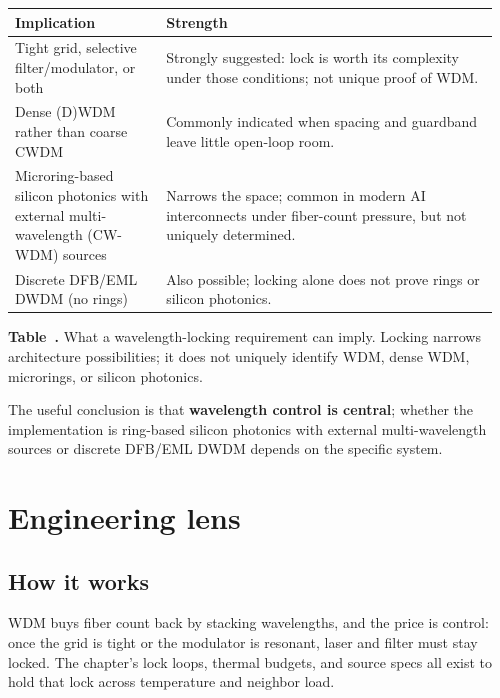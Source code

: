 \begin{table}[ht]
\label{tab:wdm-read}%
\centering
\setlength{\tabcolsep}{5pt}%
\renewcommand{\arraystretch}{1.25}%
\begin{tabular}{@{}p{0.30\linewidth}p{0.66\linewidth}@{}}
\toprule
Implication & Strength \\
\midrule
Tight grid, selective filter/modulator, or both & Strongly suggested: lock is worth its complexity under those conditions; not unique proof of WDM. \\
\addlinespace[1.5em]
Dense (D)WDM rather than coarse CWDM & Commonly indicated when spacing and guardband leave little open-loop room. \\
\addlinespace[1.5em]
Microring-based silicon photonics with external multi-wavelength (CW-WDM) sources & Narrows the space; common in modern AI interconnects under fiber-count pressure, but not uniquely determined. \\
\addlinespace[1.5em]
Discrete DFB/EML DWDM (no rings) & Also possible; locking alone does not prove rings or silicon photonics. \\
\bottomrule
\end{tabular}
\par\medskip
{\raggedright\footnotesize\textbf{Table~\thetable.} What a wavelength-locking
requirement can imply. Locking narrows architecture possibilities; it does not
uniquely identify WDM, dense WDM, microrings, or silicon photonics.\par}
\end{table}

The useful conclusion is that \textbf{wavelength control is central}; whether the
implementation is ring-based silicon photonics with external multi-wavelength
sources or discrete DFB/EML DWDM depends on the specific system.

\section{Engineering lens}
\label{sec:wdm-engineering-lens}

\subsection{How it works}

WDM buys fiber count back by stacking wavelengths, and the price is control: once
the grid is tight or the modulator is resonant, laser and filter must stay locked.
The chapter's lock loops, thermal budgets, and source specs all exist to hold that
lock across temperature and neighbor load.

